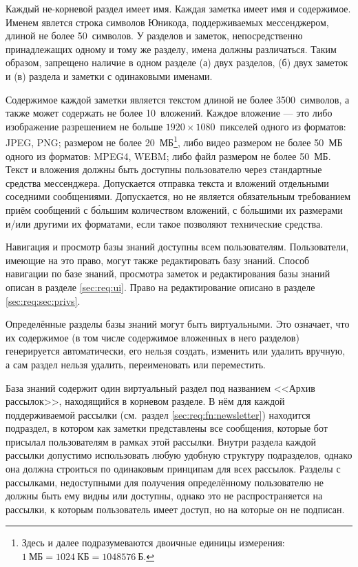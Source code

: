     Каждый не-корневой раздел имеет имя. Каждая заметка имеет имя и содержимое.
    Именем явлется строка символов Юникода, поддерживаемых мессенджером, длиной
    не более 50~символов. У разделов и заметок, непосредственно принадлежащих одному и тому же
    разделу, имена должны различаться. Таким образом, запрещено наличие в одном разделе
    (а) двух разделов, (б) двух заметок и (в) раздела и заметки с одинаковыми именами.

    Содержимое каждой заметки является текстом длиной не более 3500~символов, а также может содержать
    не более 10~вложений. Каждое вложение --- это либо изображение разрешением не больше
    \(1920 \times 1080\)~пикселей одного из форматов: JPEG, PNG; размером не более
    20~МБ\footnote{
        Здесь и далее подразумеваются двоичные единицы измерения: \(1~\text{МБ} = 1024~\text{КБ}
        = 1048576~\text{Б}\).
    }, либо видео размером не более 50~МБ одного из форматов: MPEG4, WEBM; либо файл размером не более 50~МБ.
    Текст и вложения должны быть доступны пользователю
    через стандартные средства мессенджера. Допускается отправка текста и вложений
    отдельными соседними сообщениями.
    Допускается, но не является обязательным требованием приём сообщений с б\'ольшим количеством вложений,
    с б\'ольшими их размерами и/или другими их форматами, если такое позволяют технические средства.

    Навигация и просмотр базы знаний доступны всем пользователям.
    Пользователи, имеющие на это право, могут также редактировать базу знаний.
    Способ навигации по базе знаний, просмотра заметок и редактирования базы знаний
    описан в разделе \ref{sec:req:ui}.
    Право на редактирование описано в разделе
    \ref{sec:req:sec:privs}.

    Определённые разделы базы знаний могут быть виртуальными. Это означает, что их содержимое
    (в том числе содержимое вложенных в него разделов)
    генерируется автоматически, его нельзя создать, изменить или удалить вручную,
    а сам раздел нельзя удалить, переименовать или переместить.

    База знаний содержит один виртуальный раздел под названием <<Архив рассылок>>,
    находящийся в корневом разделе. В нём для каждой поддерживаемой рассылки
    (см.~раздел \ref{sec:req:fn:newsletter}) находится
    подраздел, в котором как заметки представлены все сообщения, которые бот присылал пользователям
    в рамках этой рассылки. Внутри раздела каждой рассылки допустимо использовать любую
    удобную структуру подразделов, однако она должна строиться по одинаковым принципам для всех рассылок.
    Разделы с рассылками, недоступными для получения определённому пользователю не должны быть ему
    видны или доступны, однако это не распространяется на рассылки, к которым пользователь имеет
    доступ, но на которые он не подписан.

